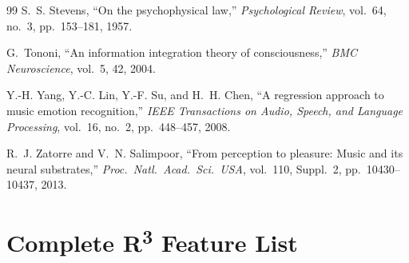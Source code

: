 \documentclass[10pt,twocolumn]{article}
\newcommand{\Rtri}{R\textsuperscript{3}}
\begin{document}
\begin{thebibliography}{99}
S.~S. Stevens, ``On the psychophysical law,'' \textit{Psychological Review}, vol.~64, no.~3, pp.~153--181, 1957.

G.~Tononi, ``An information integration theory of consciousness,'' \textit{BMC Neuroscience}, vol.~5, 42, 2004.

Y.-H. Yang, Y.-C. Lin, Y.-F. Su, and H.~H. Chen, ``A regression approach to music emotion recognition,'' \textit{IEEE Transactions on Audio, Speech, and Language Processing}, vol.~16, no.~2, pp.~448--457, 2008.

R.~J. Zatorre and V.~N. Salimpoor, ``From perception to pleasure: Music and its neural substrates,'' \textit{Proc.\ Natl.\ Acad.\ Sci.\ USA}, vol.~110, Suppl.~2, pp.~10430--10437, 2013.

\end{thebibliography}


\onecolumn
\appendix

\section{Complete \Rtri{} Feature List}
\label{app:r3}
\end{document}
